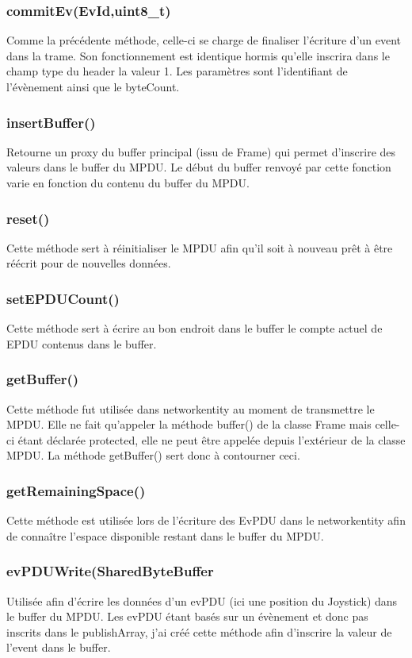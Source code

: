 \documentclass{report}
\begin{document}
\subsubsection{commitEv(EvId,uint8\_t)}
Comme la précédente méthode, celle-ci se charge de finaliser l'écriture d'un event dans la trame. Son fonctionnement est identique hormis qu'elle inscrira dans le champ type du header la valeur 1. Les paramètres sont l'identifiant de l'évènement ainsi que le byteCount.
\subsubsection{insertBuffer()}
Retourne un proxy du buffer principal (issu de Frame) qui permet d'inscrire des valeurs dans le buffer du MPDU. Le début du buffer renvoyé par cette fonction varie en fonction du contenu du buffer du MPDU.
\subsubsection{reset()}
Cette méthode sert à réinitialiser le MPDU afin qu'il soit à nouveau prêt à être réécrit pour de nouvelles données.
\subsubsection{setEPDUCount()}
Cette méthode sert à écrire au bon endroit dans le buffer le compte actuel de EPDU contenus dans le buffer.
\subsubsection{getBuffer()}
Cette méthode fut utilisée dans networkentity au moment de transmettre le MPDU. Elle ne fait qu'appeler la méthode buffer() de la classe Frame mais celle-ci étant déclarée protected, elle ne peut être appelée depuis l'extérieur de la classe MPDU. La méthode getBuffer() sert donc à contourner ceci.
\subsubsection{getRemainingSpace()}
Cette méthode est utilisée lors de l'écriture des EvPDU dans le networkentity afin de connaître l'espace disponible restant dans le buffer du MPDU.
\subsubsection{evPDUWrite(SharedByteBuffer}
Utilisée afin d'écrire les données d'un evPDU (ici une position du Joystick) dans le buffer du MPDU. Les evPDU étant basés sur un évènement et donc pas inscrits dans le publishArray, j'ai créé cette méthode afin d'inscrire la valeur de l'event dans le buffer.
\end{document}
